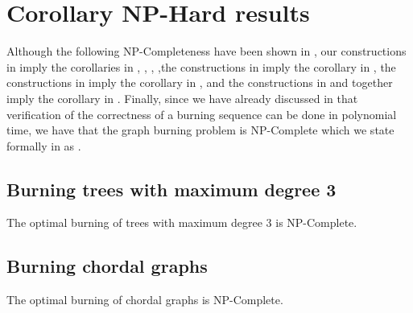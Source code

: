 
\section{Corollary NP-Hard results}

Although the following NP-Completeness have been shown in \cite{Bessy2017}, our constructions in  imply the corollaries in , , , ,the constructions in  imply the corollary in , the constructions in  imply the corollary in , and the constructions in  and  together imply the corollary in . Finally, since we have already discussed in  that verification of the correctness of a burning sequence can be done in polynomial time, we have that the graph burning problem is NP-Complete which we state formally in  as .

\subsection{Burning trees with maximum degree 3}\label{subsection:burn-trees}

\begin{corollary}
    The optimal burning of trees with maximum degree $3$ is NP-Complete.
\end{corollary}

\subsection{Burning chordal graphs}\label{subsection:burn-chordal-graphs}

\begin{corollary}
    The optimal burning of chordal graphs is NP-Complete.
\end{corollary}

